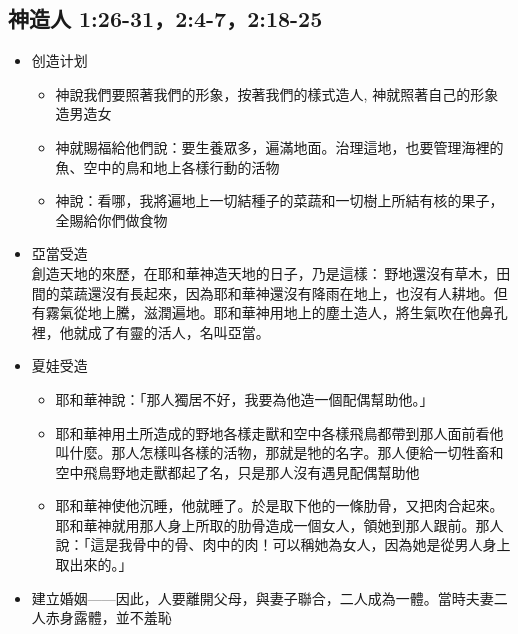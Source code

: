 \subsection{神造人 1:26-31，2:4-7，2:18-25}
\begin{itemize} 
\itemsep-.35em 
\item 创造计划
\begin{itemize} 
\itemsep-.35em 
\item 神說我們要照著我們的形象，按著我們的樣式造人, 神就照著自己的形象造男造女
\item 神就賜福給他們說：要生養眾多，遍滿地面。治理這地，也要管理海裡的魚、空中的鳥和地上各樣行動的活物
\item 神說：看哪，我將遍地上一切結種子的菜蔬和一切樹上所結有核的果子，全賜給你們做食物
\end{itemize}
\item 亞當受造\\
創造天地的來歷，在耶和華神造天地的日子，乃是這樣： 野地還沒有草木，田間的菜蔬還沒有長起來，因為耶和華神還沒有降雨在地上，也沒有人耕地。但有霧氣從地上騰，滋潤遍地。耶和華神用地上的塵土造人，將生氣吹在他鼻孔裡，他就成了有靈的活人，名叫亞當。
\item 夏娃受造
\begin{itemize} 
\itemsep-.35em 
\item 耶和華神說：「那人獨居不好，我要為他造一個配偶幫助他。」 
\item 耶和華神用土所造成的野地各樣走獸和空中各樣飛鳥都帶到那人面前看他叫什麼。那人怎樣叫各樣的活物，那就是牠的名字。那人便給一切牲畜和空中飛鳥野地走獸都起了名，只是那人沒有遇見配偶幫助他 
\item 耶和華神使他沉睡，他就睡了。於是取下他的一條肋骨，又把肉合起來。耶和華神就用那人身上所取的肋骨造成一個女人，領她到那人跟前。那人說：「這是我骨中的骨、肉中的肉！可以稱她為女人，因為她是從男人身上取出來的。」 
\end{itemize}
\item 建立婚姻——因此，人要離開父母，與妻子聯合，二人成為一體。當時夫妻二人赤身露體，並不羞恥
\end{itemize}


